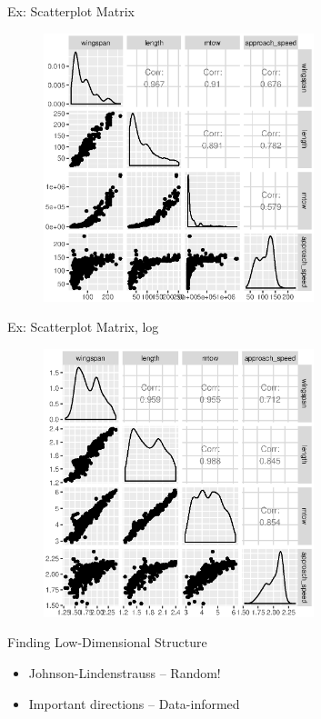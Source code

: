 \documentclass[14pt]{beamer}
\begin{document}
\begin{frame}{Ex: Scatterplot Matrix}
  \begin{figure}
    \centering\includegraphics[width=0.7\textwidth]{./images/faa_min_scatter}
  \end{figure}
\end{frame}

\begin{frame}{Ex: Scatterplot Matrix, log}
  \begin{figure}
    \centering\includegraphics[width=0.7\textwidth]{./images/faa_min_scatter_log}
  \end{figure}
\end{frame}

\begin{frame}{Finding Low-Dimensional Structure}
  \begin{itemize}
  \item Johnson-Lindenstrauss -- Random!
  \item Important directions -- Data-informed
  \end{itemize}
\end{frame}
\end{document}
